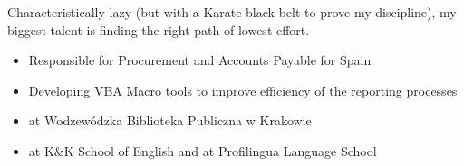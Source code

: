 \documentclass[10pt,a4paper]{../altacv}
\begin{document}

\begin{fullwidth}
\makecvheader
\end{fullwidth}

Characteristically lazy (but with a Karate black belt to prove my discipline), my biggest talent is finding the right path of lowest effort.
\medskip



\begin{itemize}
\item Responsible for Procurement and Accounts Payable for Spain
\item Developing VBA Macro tools to improve efficiency of the reporting processes
\end{itemize}

\divider

\begin{itemize}
\item at Wodzewódzka Biblioteka Publiczna w Krakowie
\item at K\&K School of English and at Profilingua Language School
\end{itemize}

\end{document}
